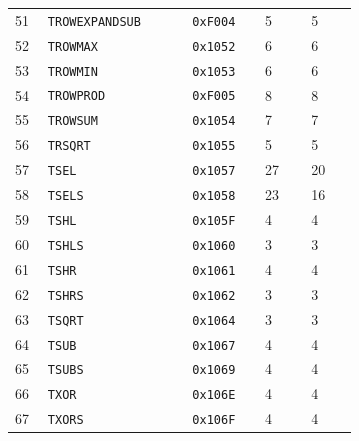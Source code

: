 {\begin{longtable}{@{}R{0.045\linewidth}L{0.31\linewidth}L{0.13\linewidth}R{0.10\linewidth}R{0.10\linewidth}@{}}
51 & \texttt{TROWEXPANDSUB} & \texttt{0xF004} & 5 & 5 \\
52 & \texttt{TROWMAX} & \texttt{0x1052} & 6 & 6 \\
53 & \texttt{TROWMIN} & \texttt{0x1053} & 6 & 6 \\
54 & \texttt{TROWPROD} & \texttt{0xF005} & 8 & 8 \\
55 & \texttt{TROWSUM} & \texttt{0x1054} & 7 & 7 \\
56 & \texttt{TRSQRT} & \texttt{0x1055} & 5 & 5 \\
57 & \texttt{TSEL} & \texttt{0x1057} & 27 & 20 \\
58 & \texttt{TSELS} & \texttt{0x1058} & 23 & 16 \\
59 & \texttt{TSHL} & \texttt{0x105F} & 4 & 4 \\
60 & \texttt{TSHLS} & \texttt{0x1060} & 3 & 3 \\
61 & \texttt{TSHR} & \texttt{0x1061} & 4 & 4 \\
62 & \texttt{TSHRS} & \texttt{0x1062} & 3 & 3 \\
63 & \texttt{TSQRT} & \texttt{0x1064} & 3 & 3 \\
64 & \texttt{TSUB} & \texttt{0x1067} & 4 & 4 \\
65 & \texttt{TSUBS} & \texttt{0x1069} & 4 & 4 \\
66 & \texttt{TXOR} & \texttt{0x106E} & 4 & 4 \\
67 & \texttt{TXORS} & \texttt{0x106F} & 4 & 4 \\
\bottomrule
\end{longtable}
}
